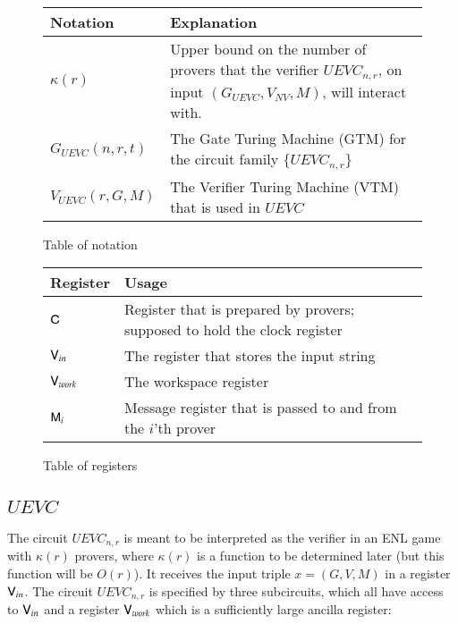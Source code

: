 \begin{figure}[H]
\begin{center}
    \begin{tabular}{ | l | p{10cm} |}
    \hline
    \textbf{Notation} & \textbf{Explanation} \\ \hline
    $\kappa(r)$ 		& Upper bound on the number of provers that the verifier $UEVC_{n,r}$, on input $(G_{UEVC},V_{NV},M)$, will interact with.  \\ \hline
    
    $G_{UEVC}(n,r,t)$ 			& The Gate Turing Machine (GTM) for the circuit family $\{ UEVC_{n,r} \}$ \\ \hline
    
    $V_{UEVC}(r,G,M)$			& The Verifier Turing Machine (VTM) that is used in $UEVC$ \\ \hline
    \end{tabular}
\end{center}
\caption{Table of notation}
\end{figure}

\begin{figure}[H]
\begin{center}
    \begin{tabular}{ | l | p{10cm} |}
    \hline
    \textbf{Register} & \textbf{Usage}\\ \hline
    ${\mathsf{C}}$			& Register that is prepared by provers; supposed to hold the clock register 			\\ \hline
    ${\mathsf{V}}_{in}$ 		& The register that stores the input string 	 \\ \hline
    ${\mathsf{V}}_{work}$	& The workspace register 									\\ \hline
    ${\mathsf{M}}_i$			& Message register that is passed to and from  the $i$'th prover	  \\ \hline
    \end{tabular}
\end{center}
\caption{Table of registers}
\end{figure}

\subsection{$UEVC$}

\label{sec:specs}

The circuit $UEVC_{n,r}$ is meant to be interpreted as the verifier in an ENL game with $\kappa(r)$ provers, where $\kappa(r)$ is a function to be determined later (but this function will be $O(r)$). It receives the input triple $x = (G,V,M)$ in a register ${\mathsf{V}}_{in}$. The circuit $UEVC_{n,r}$ is specified by three subcircuits, which all have access to ${\mathsf{V}}_{in}$ and a register ${\mathsf{V}}_{work}$ which is a sufficiently large ancilla register:

